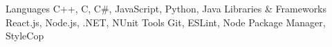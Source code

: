 \begin{cvhonors}
  \cvhonor
    {Languages}
    {C++, C, C\#, JavaScript, Python, Java}
    {}
    {}
  \cvhonor
    {Libraries \& Frameworks}
    {React.js, Node.js, .NET, NUnit }
    {}
    {}
    \cvhonor
    {Tools}
    {Git, ESLint, Node Package Manager, StyleCop}
    {}
    {}
\end{cvhonors}